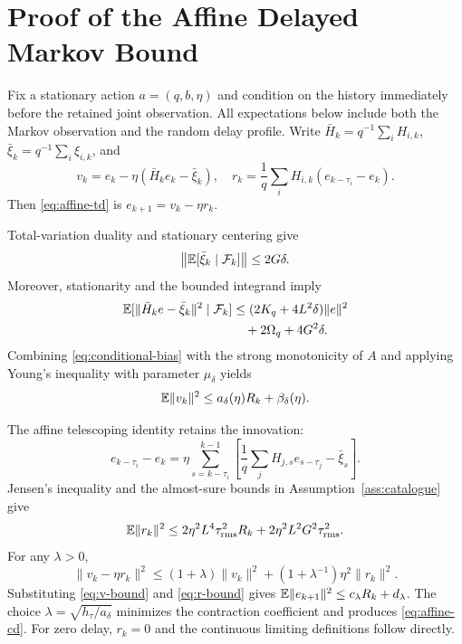 \section{Proof of the Affine Delayed Markov Bound}
Fix a stationary action $a=(q,b,\eta)$ and condition on the history immediately before the retained joint observation.
All expectations below include both the Markov observation and the random delay profile.
Write $\bar H_k=q^{-1}\sum_iH_{i,k}$, $\bar\xi_k=q^{-1}\sum_i\xi_{i,k}$, and
\begin{equation}
v_k=e_k-\eta(\bar H_ke_k-\bar\xi_k),
\quad
r_k=\frac1q\sum_iH_{i,k}(e_{k-\tau_i}-e_k).
\label{eq:appendix-vr}
\end{equation}
Then \eqref{eq:affine-td} is $e_{k+1}=v_k-\eta r_k$.

Total-variation duality and stationary centering give
\begin{equation}
\left\|\mathbb{E}[\bar\xi_k\mid\mathcal{F}_k]\right\|\le2G\delta.
\label{eq:conditional-bias}
\end{equation}
Moreover, stationarity and the bounded integrand imply
\begin{align}
\mathbb{E}[\|\bar H_ke-\bar\xi_k\|^2\mid\mathcal{F}_k]
&\le(2K_q+4L^2\delta)\|e\|^2\nonumber\\
&\quad+2\Omega_q+4G^2\delta.
\label{eq:second-moment-transfer}
\end{align}
Combining \eqref{eq:conditional-bias} with the strong monotonicity of $A$ and applying Young's inequality with parameter $\mu_\delta$ yields
\begin{equation}
\mathbb{E}\|v_k\|^2\le a_\delta(\eta)R_k+\beta_\delta(\eta).
\label{eq:v-bound}
\end{equation}

The affine telescoping identity retains the innovation:
\begin{equation}
e_{k-\tau_i}-e_k=\eta\sum_{s=k-\tau_i}^{k-1}\left[\frac1q\sum_jH_{j,s}e_{s-\tau_j}-\bar\xi_s\right].
\end{equation}
Jensen's inequality and the almost-sure bounds in Assumption~\ref{ass:catalogue} give
\begin{equation}
\mathbb{E}\|r_k\|^2\le2\eta^2L^4\tau_{\rm rms}^2R_k+2\eta^2L^2G^2\tau_{\rm rms}^2.
\label{eq:r-bound}
\end{equation}
For any $\lambda>0$,
\begin{equation}
\|v_k-\eta r_k\|^2\le(1+\lambda)\|v_k\|^2+(1+\lambda^{-1})\eta^2\|r_k\|^2.
\end{equation}
Substituting \eqref{eq:v-bound} and \eqref{eq:r-bound} gives $\mathbb{E}\|e_{k+1}\|^2\le c_\lambda R_k+d_\lambda$.
The choice $\lambda=\sqrt{h_\tau/a_\delta}$ minimizes the contraction coefficient and produces \eqref{eq:affine-cd}.
For zero delay, $r_k=0$ and the continuous limiting definitions follow directly.

